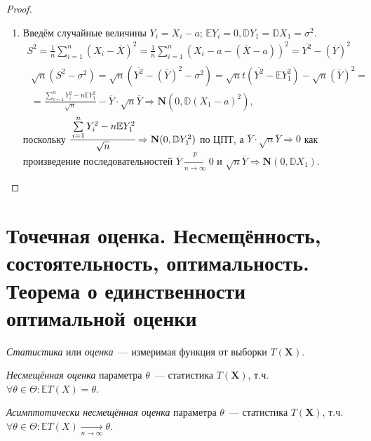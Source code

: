 \begin{proof}
\begin{enumerate}
    \item Введём случайные величины $Y_{i}=X_{i}-a$; $\mathbb{E}Y_{i} = 0, \mathbb{D} Y_{1}=\mathbb{D} X_{1}=\sigma^{2}$.
    \begin{gather*}
        S^{2}=\frac{1}{n} \sum\limits_{i=1}^{n}(X_{i}-\overline{X})^{2}=\frac{1}{n} \sum\limits_{i=1}^{n}(X_{i}-a-(\overline{X}-a))^{2}=\overline{Y^{2}}-(\overline{Y})^{2} \\
        \begin{aligned}
            \sqrt{n}(S^{2}-\sigma^{2}) = \sqrt{n}(\overline{Y^{2}}-(\overline{Y})^{2}-\sigma^{2})
            = \sqrt{n}t(\overline{Y^{2}}-\mathbb{E} Y_{1}^{2})-\sqrt{n}(\overline{Y})^{2} = \\
            =\frac{\sum\limits_{i=1}^{n} Y_{i}^{2}-n \mathbb{E} Y_{1}^{2}}{\sqrt{n}}-\overline{Y} \cdot \sqrt{n} \overline{Y} \Rightarrow \mathbf{N}(0, \mathbb{D}(X_{1}-a)^{2}),
    \end{aligned}
    \end{gather*}
    поскольку $\cfrac{\sum\limits_{i=1}^{n} Y_{i}^{2}-n \mathbb{E} Y_{1}^{2}}{\sqrt{n}} \Rightarrow \mathbf{N}(0, \mathbb{D} Y_{1}^{2})$ по ЦПТ, а $\overline{Y} \cdot \sqrt{n} \overline{Y} \Rightarrow 0$ как произведение последовательностей $\overline{Y} \xrightarrow[n \rightarrow \infty]{p} 0$ и $\sqrt{n} \overline{Y} \Rightarrow \mathbf{N}(0, \mathbb{D} X_{1})$.
\end{enumerate}
\end{proof}

\section{Точечная оценка. Несмещённость, состоятельность, оптимальность. Теорема о единственности оптимальной оценки}
\begin{defn}
{\it Статистика} или {\it оценка}~--- измеримая функция от выборки $T(\mathbf{X})$.
\end{defn}

\begin{defn}
{\it Несмещённая оценка} параметра $\theta$~--- статистика $T(\mathbf{X})$, т.ч. $\forall \theta \in \Theta: \mathbb{E}T(X) = \theta$.
\end{defn}

\begin{defn}
{\it Асимптотически несмещённая оценка} параметра $\theta$~--- статистика $T(\mathbf{X})$, т.ч. $\forall \theta \in \Theta: \mathbb{E}T(X) \xrightarrow[n \rightarrow \infty]{} \theta$.
\end{defn}

